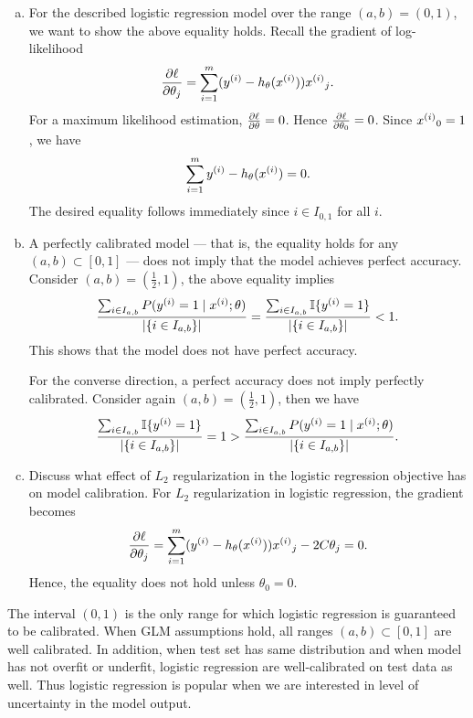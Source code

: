 \documentclass[12pt,letterpaper,boxed]{hmcpset}
\newcommand{\ind}[1]{\mathbb{I}\{#1\}}
\begin{document}
\begin{solution}
  \begin{enumerate}[(a)]
    \item For the described logistic regression model over the range $(a,b) = (0,1)$, we want to show the above equality holds. Recall the gradient of log-likelihood
    \[
    \pdv{\ell}{\theta_j} = \sum_{i=1}^m (\yy - h_{\theta}(\xx)) \xx_j.
    \]
    For a maximum likelihood estimation, $\pdv{\ell}{\theta} = 0$. Hence $\pdv{\ell}{\theta_0} = 0$. Since $\xx_0 = 1$, we have
    \[
    \sum_{i=1}^{m} \yy - h_\theta(\xx) = 0.
    \]
    The desired equality follows immediately since $i \in I_{0,1}$ for all $i$.

    \item A perfectly calibrated model — that is, the equality holds for any $(a,b) \subset [0,1]$ — does not imply that the model achieves perfect accuracy. Consider $(a,b) = (\frac{1}{2}, 1)$, the above equality implies 
    \[
    \frac{\sum_{i \in I_{a,b}} P(\yy = 1 \mid \xx; \theta)}{\abs{\{i \in I_{a,b}\}}} = \frac{\sum_{i \in I_{a,b}} \ind{\yy = 1}}{\abs{ \{i \in I_{a,b}\} }} < 1.
    \]
    This shows that the model does not have perfect accuracy.

    For the converse direction, a perfect accuracy does not imply perfectly calibrated. Consider again $(a,b) = (\frac{1}{2}, 1)$, then we have
    \[
    \frac{\sum_{i \in I_{a,b}} \ind{\yy = 1}}{\abs{ \{i \in I_{a,b}\} }} = 1 > \frac{\sum_{i \in I_{a,b}} P(\yy = 1 \mid \xx; \theta)}{\abs{\{i \in I_{a,b}\}}}.
    \]

    \item Discuss what effect of $L_2$ regularization in the logistic regression objective has on model calibration. For $L_2$ regularization in logistic regression, the gradient becomes
    \[
    \pdv{\ell}{\theta_j} = \sum_{i=1}^m (\yy - h_{\theta}(\xx)) \xx_j - 2C \theta_j = 0.
    \]
    Hence, the equality does not hold unless $\theta_0 = 0$. 
  \end{enumerate}
\end{solution}

\begin{remark}
  The interval $(0,1)$ is the only range for which logistic regression is guaranteed to be calibrated. When GLM assumptions hold, all ranges $(a,b) \subset [0,1]$ are well calibrated. In addition, when test set has same distribution and when model has not overfit or underfit, logistic regression are well-calibrated on test data as well. Thus logistic regression is popular when we are interested in level of uncertainty in the model output. 
\end{remark}
\end{document}
